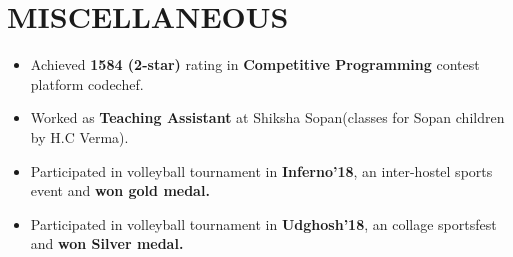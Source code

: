 \documentclass[13pt,a4paper,roman]{moderncv}
\begin{document}
\section{MISCELLANEOUS}
\begin{minipage}{\maincolumnwidth}
	
	\small{
    	\begin{itemize}
          \item  \large Achieved \textbf{1584 (2-star)} rating in \textbf{Competitive Programming} contest platform codechef.

          
          \item \large Worked as \textbf{Teaching Assistant} at Shiksha Sopan(classes for Sopan children by H.C Verma).
          
          \item  \large Participated in volleyball tournament in \textbf{Inferno'18}, an inter-hostel sports event and \textbf {won gold medal.} 
          \item  \large Participated in volleyball tournament in \textbf{Udghosh'18}, an collage sportsfest  and \textbf {won Silver medal.} 
          
          
          
		\end{itemize}
		}
		
\end{minipage}
      

\nocite{*}

                       
\end{document}
